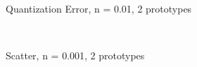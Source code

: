 \documentclass[10pt,a4paper]{article}
\begin{document}
\begin{figure}
  \centering
{} \\
  \caption{Quantization Error, n = 0.01, 2 prototypes}
  \label{fig:n001_k2_learning}
\end{figure}

\begin{figure}
  \centering
{} \\
  \caption{Scatter, n = 0.001, 2 prototypes}
  \label{fig:n0001_k2}
\end{figure}
\end{document}
